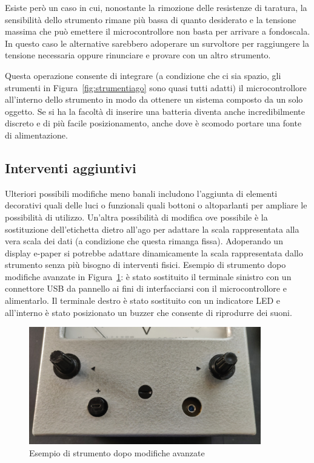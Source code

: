 \documentclass[12pt,a4paper]{report}
\begin{document}
Esiste però un caso in cui, nonostante la rimozione delle resistenze di taratura, la sensibilità dello strumento rimane più bassa di quanto
desiderato e la tensione massima che può emettere il microcontrollore non basta per arrivare a fondoscala. In questo caso le alternative
sarebbero adoperare un survoltore per raggiungere la tensione necessaria oppure rinunciare e provare con un altro strumento.

Questa operazione consente di integrare (a condizione che ci sia spazio, gli strumenti in Figura~\ref{fig:strumentiago} sono quasi tutti
adatti) il microcontrollore all'interno dello strumento in modo da ottenere un sistema composto da un solo oggetto.
Se si ha la facoltà di inserire una batteria diventa anche incredibilmente discreto e di più facile posizionamento, anche dove è
scomodo portare una fonte di alimentazione.

\subsection{Interventi aggiuntivi}
Ulteriori possibili modifiche meno banali includono l'aggiunta di elementi decorativi quali delle luci o funzionali quali bottoni o altoparlanti
per ampliare le possibilità di utilizzo. Un'altra possibilità di modifica ove possibile è la sostituzione dell'etichetta dietro all'ago per adattare
la scala rappresentata alla vera scala dei dati (a condizione che questa rimanga fissa). Adoperando un display e-paper si potrebbe
adattare dinamicamente la scala rappresentata dallo strumento senza più bisogno di interventi fisici. Esempio di strumento dopo
modifiche avanzate in Figura~\ref{fig:interventocompleto}: è stato sostituito il terminale sinistro con un connettore USB da pannello
ai fini di interfacciarsi con il microcontrollore e alimentarlo. Il terminale destro è stato sostituito con un indicatore LED e all'interno è stato
posizionato un buzzer che consente di riprodurre dei suoni.

\begin{figure}[h]
  \centering
  \includegraphics[width=0.9\textwidth]{interventocompleto}
  \caption{Esempio di strumento dopo modifiche avanzate}
  \label{fig:interventocompleto}
\end{figure}
\end{document}
